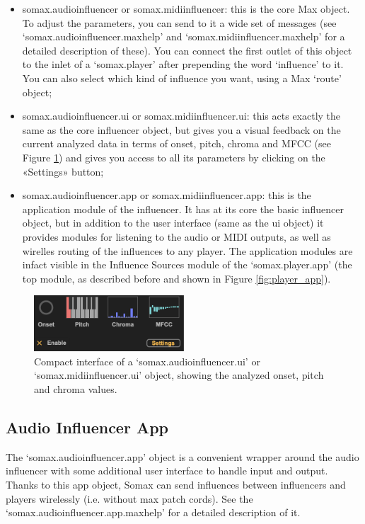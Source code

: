\begin{itemize}
    \item somax.audioinfluencer or somax.midiinfluencer: this is the core Max object. To adjust the parameters, you can send to it a wide set of messages (see `somax.audioinfluencer.maxhelp' and `somax.midiinfluencer.maxhelp' for a detailed description of these). You can connect the first outlet of this object to the inlet of a `somax.player' after prepending the word `influence' to it. You can also select which kind of influence you want, using a Max `route' object;
    \item somax.audioinfluencer.ui or somax.midiinfluencer.ui: this acts exactly the same as the core influencer object, but gives you a visual feedback on the current analyzed data in terms of onset, pitch, chroma and MFCC (see Figure \ref{fig:influencer_ui}) and gives you access to all its parameters by clicking on the «Settings» button;
    \item somax.audioinfluencer.app or somax.midiinfluencer.app: this is the application module of the influencer. It has at its core the basic influencer object, but in addition to the user interface (same as the ui object) it provides modules for listening to the audio or MIDI outputs, as well as wirelles routing of the influences to any player. The application modules are infact visible in the Influence Sources module of the `somax.player.app' (the top module, as described before and shown in Figure \ref{fig:player_app}).
\end{itemize}


 \begin{figure}[H]
    \centering        
 	\includegraphics[width=0.5\textwidth, keepaspectratio]{img/influencer_ui.png}
    \caption{Compact interface of a `somax.audioinfluencer.ui' or `somax.midiinfluencer.ui' object, showing the analyzed onset, pitch and chroma values.}
    \label{fig:influencer_ui}
\end{figure}


\subsection{Audio Influencer App}

The `somax.audioinfluencer.app' object is a convenient wrapper around the audio influencer with some additional user interface to handle input and output. Thanks to this app object, Somax can send influences between influencers and players wirelessly (i.e. without max patch cords). 
See the `somax.audioinfluencer.app.maxhelp' for a detailed description of it. 

